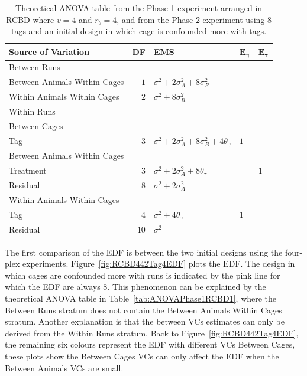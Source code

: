 \documentclass[12pt,a4paper]{article}
\begin{document}
\begin{table}[ht]
\centering
 \caption{Theoretical ANOVA table from the Phase 1 experiment arranged in RCBD where $v = 4$ and $r_b = 4$, and from the Phase 2 experiment using 8 tags and an initial design in which cage is confounded more with tags.}
 \begin{tabular}[t]{lrlll} 
 \toprule 
 \multicolumn{1}{l}{\textbf{Source of Variation}} & \multicolumn{1}{l}{\textbf{DF}} & \multicolumn{1}{l}{\textbf{EMS}}& \multicolumn{1}{l}{$\bm{E_{\gamma}}$}&\multicolumn{1}{l}{$\bm{E_{\tau}}$}\\ 
 \midrule 
 Between Runs &  &  & & \\ 
 \quad Between Animals Within Cages & $1$ & $\sigma^2+2\sigma_{A}^2+8\sigma_{R}^2$ & & \\ 
 \quad Within Animals Within Cages & $2$ & $\sigma^2+8\sigma_{R}^2$ & & \\ \hline 
 Within Runs &  &  & & \\ 
 \quad Between Cages &  &  & & \\ 
 \quad \quad Tag & $3$ & $\sigma^2+2\sigma_{A}^2+8\sigma_{B}^2+4\theta_{\gamma}$ &$1$ & \\ \hline 
 \quad Between Animals Within Cages &  &  & & \\ 
 \quad \quad Treatment & $3$ & $\sigma^2+2\sigma_{A}^2+8\theta_{\tau}$ & & $1$\\ 
 \quad \quad Residual & $8$ & $\sigma^2+2\sigma_{A}^2$ & & \\ \hline 
 \quad Within Animals Within Cages &  &  & & \\ 
 \quad \quad Tag & $4$ & $\sigma^2+4\theta_{\gamma}$ &$1$ & \\ 
 \quad \quad Residual & $10$ & $\sigma^2$ & & \\ 
 \bottomrule 
 \end{tabular} 
 \label{tab:ANOVAPhase1RCBD4} 
\end{table} 

The first comparison of the EDF is between the two initial designs using the four-plex experiments. Figure~\ref{fig:RCBD442Tag4EDF} plots the EDF. The design in which cages are confounded more with runs is indicated by the pink line for which the EDF are always 8. This phenomenon can be explained by the theoretical ANOVA table in Table~\ref{tab:ANOVAPhase1RCBD1}, where the Between Runs stratum does not contain the Between Animals Within Cages stratum. Another explanation is that the between VCs estimates can only be derived from the Within Runs stratum. Back to Figure~\ref{fig:RCBD442Tag4EDF}, the remaining six colours represent the EDF with different VCs Between Cages, these plots show the Between Cages VCs can only affect the EDF when the Between Animals VCs are small.  
\end{document}
